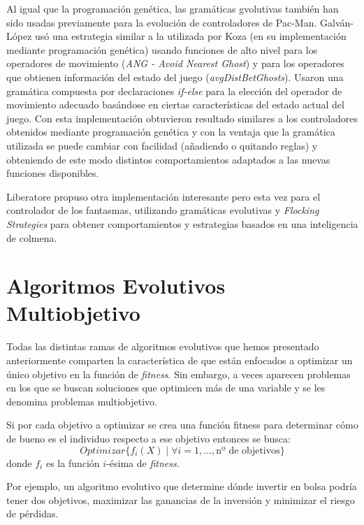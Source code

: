 \blankline

Al igual que la programación genética, las gramáticas gvolutivas también han sido usadas previamente para la evolución de controladores de Pac-Man. Galván-López \cite{galvan2010evolving} usó una estrategia similar a la utilizada por Koza (en su implementación mediante programación genética) usando funciones de alto nivel para los operadores de movimiento (\textit{ANG - Avoid Nearest Ghost}) y para los operadores que obtienen información del estado del juego (\textit{avgDistBetGhosts}). Usaron una gramática compuesta por declaraciones \textit{if-else} para la elección del operador de movimiento adecuado basándose en ciertas características del estado actual del juego. Con esta implementación obtuvieron resultado similares a los controladores obtenidos mediante programación genética y con la ventaja que la gramática utilizada se puede cambiar con facilidad (añadiendo o quitando reglas) y obteniendo de este modo distintos comportamientos adaptados a las nuevas funciones disponibles.

Liberatore \cite{Liberatore2014} propuso otra implementación interesante pero esta vez para el controlador de los fantasmas, utilizando gramáticas evolutivas y \textit{Flocking Strategies} para obtener comportamientos y estrategias basados en una inteligencia de colmena.

\section{Algoritmos Evolutivos Multiobjetivo}
Todas las distintas ramas de algoritmos evolutivos que hemos presentado anteriormente comparten la característica de que están enfocados a optimizar  un único objetivo en la  función de \textit{fitness}. Sin embargo, a veces aparecen problemas en los que se buscan soluciones que optimicen más de una variable y se les denomina problemas multiobjetivo.

Si por cada objetivo a optimizar se crea una función fitness para determinar cómo de bueno es el individuo respecto a ese objetivo entonces se busca:
\begin{equation*}
Optimizar \{f_i(X) \mid \forall i = 1, \dots, \textrm{nº de objetivos}\}
\end{equation*}
donde $f_i$ es la función $i$-ésima de \textit{fitness}.

Por ejemplo, un algoritmo evolutivo que determine dónde invertir en bolsa podría tener dos objetivos, maximizar las ganancias de la inversión y minimizar el riesgo de pérdidas.

